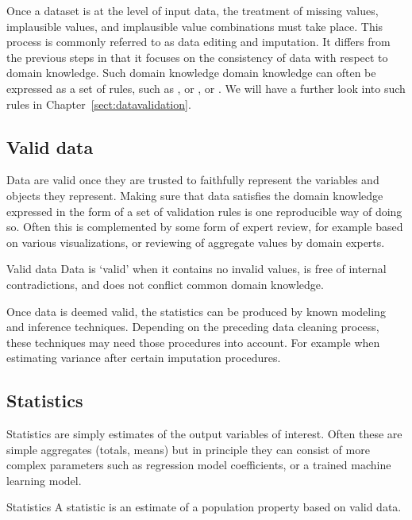 Once a dataset is at the level of input data, the treatment of missing values,
implausible values, and implausible value combinations must take place. This
process is commonly referred to as data editing and imputation. It differs from
the previous steps in that it focuses on the consistency of data with respect
to domain knowledge. Such domain knowledge domain knowledge can often be
expressed as a set of rules, such as , or , or . We will have a further look
into such rules in Chapter~\ref{sect:datavalidation}.

\subsection*{Valid data}
Data are valid once they are trusted to faithfully represent the variables and
objects they represent. Making sure that data satisfies the domain knowledge
expressed in the form of a set of validation rules is one reproducible way of
doing so. Often this is complemented by some form of expert review, for example
based on various visualizations, or reviewing of aggregate values by domain
experts.

\begin{terminology}{Valid data}
Data is `valid' when it contains no invalid values, is free of internal
contradictions, and does not conflict common domain knowledge.
\end{terminology}

Once data is deemed valid, the statistics can be produced by known modeling and
inference techniques. Depending on the preceding data cleaning process, these
techniques may need those procedures into account. For example when estimating
variance after certain imputation procedures.


\subsection*{Statistics}
Statistics are simply estimates of the output variables of interest. Often these
are simple aggregates (totals, means) but in principle they can consist of more
complex parameters such as regression model coefficients, or a trained 
machine learning model. 

\begin{terminology}{Statistics}
A statistic is an estimate of a population property based on valid data.
\end{terminology}

